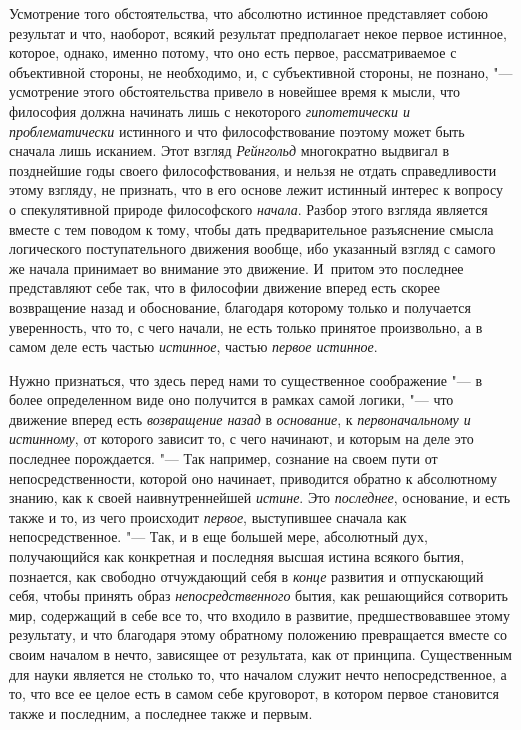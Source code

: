 Усмотрение того обстоятельства, что абсолютно истинное представляет собою
результат и что, наоборот, всякий результат предполагает некое первое
истинное, которое, однако, именно потому, что оно есть первое,
рассматриваемое с объективной стороны, не необходимо, и, с субъективной
стороны, не познано, "--- усмотрение этого обстоятельства привело в новейшее
время к мысли, что философия должна начинать лишь с некоторого
{\em гипотетически и проблематически} истинного и что
философствование поэтому может быть сначала лишь исканием. Этот взгляд
{\em Рейнгольд} многократно выдвигал в позднейшие годы
своего философствования, и нельзя не отдать справедливости этому взгляду,
не признать, что в его основе лежит истинный интерес к вопросу о
спекулятивной природе философского {\em начала}. Разбор
этого взгляда является вместе с тем поводом к тому, чтобы дать
предварительное разъяснение смысла логического поступательного движения
вообще, ибо указанный взгляд с самого же начала принимает во внимание это
движение. И~притом это последнее представляют себе так, что в философии
движение вперед есть скорее возвращение назад и обоснование, благодаря
которому только и получается уверенность, что то, с чего начали, не есть
только принятое произвольно, а в самом деле есть частью
{\em истинное}, частью {\em первое истинное}.

Нужно признаться, что здесь перед нами то существенное соображение "--- в более
определенном виде оно получится в рамках самой логики, "--- что движение
вперед есть {\em возвращение назад} в {\em основание}, к
{\em первоначальному и истинному}, от которого зависит
то, с чего начинают, и которым на деле это последнее порождается. "--- Так
например, сознание на своем пути от непосредственности, которой оно
начинает, приводится обратно к абсолютному знанию, как к своей
наивнутреннейшей {\em истине}. Это
{\em последнее}, основание, и есть также и то, из чего
происходит {\em первое}, выступившее сначала как
непосредственное. "--- Так, и в еще большей мере, абсолютный дух, получающийся
как конкретная и последняя высшая истина всякого бытия, познается, как
свободно отчуждающий себя в {\em конце} развития и
отпускающий себя, чтобы принять образ
{\em непосредственного} бытия, как решающийся сотворить
мир, содержащий в себе все то, что входило в развитие, предшествовавшее
этому результату, и что благодаря этому обратному положению превращается
вместе со своим началом в нечто, зависящее от результата, как от принципа.
Существенным для науки является не столько то, что началом служит нечто
непосредственное, а то, что все ее целое есть в самом себе круговорот, в
котором первое становится также и последним, а последнее также и первым.

